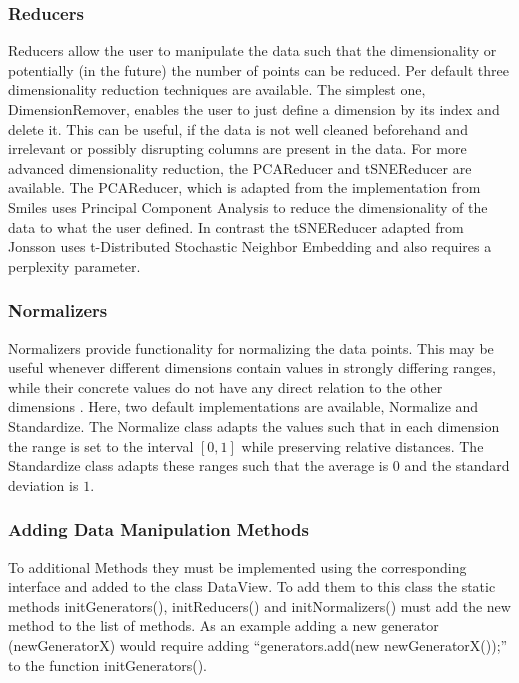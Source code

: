 \documentclass[
	a4paper,
	english,
	twoside,
	openright,               
	11pt                            
	]{report}
\begin{document}
\subsubsection{Reducers}
Reducers allow the user to manipulate the data such that the dimensionality or potentially (in the future) the number of points can be reduced. Per default three dimensionality reduction techniques are available. The simplest one, DimensionRemover, enables the user to just define a dimension by its index and delete it. This can be useful, if the data is not well cleaned beforehand and irrelevant or possibly disrupting columns are present in the data. For more advanced dimensionality reduction, the PCAReducer and tSNEReducer are available. The PCAReducer, which is adapted from the implementation from Smiles \cite{javasmile} uses Principal Component Analysis \cite{pca} to reduce the dimensionality of the data to what the user defined. In contrast the tSNEReducer adapted from Jonsson \cite{javatsne} uses t-Distributed Stochastic Neighbor Embedding \cite{Maaten2008VisualizingDU} and also requires a perplexity parameter.

\subsubsection{Normalizers}
Normalizers provide functionality for normalizing the data points. This may be useful whenever different dimensions contain values in strongly differing ranges, while their concrete values do not have any direct relation to the other dimensions \cite{normalization}. Here, two default implementations are available, Normalize and Standardize. The Normalize class adapts the values such that in each dimension the range is set to the interval $[0,1]$ while preserving relative distances. The Standardize class adapts these ranges such that the average is $0$ and the standard deviation is $1$.

\subsubsection*{Adding Data Manipulation Methods}
To additional Methods they must be implemented using the corresponding interface and added to the class DataView. To add them to this class the static methods initGenerators(), initReducers() and initNormalizers() must add the new method to the list of methods. As an example adding a new generator (newGeneratorX) would require adding ``generators.add(new newGeneratorX());'' to the function initGenerators().
\end{document}
